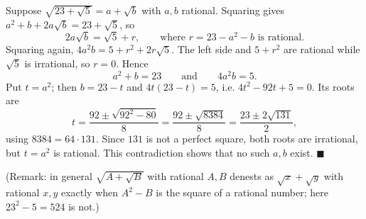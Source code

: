 Suppose $\sqrt{23+\sqrt5}=a+\sqrt b$ with $a,b$ rational. Squaring gives $a^2+b+2a\sqrt b=23+\sqrt5$, so
\[2a\sqrt b=\sqrt5+r,\qquad\text{where }r=23-a^2-b\text{ is rational}.\]
Squaring again, $4a^2b=5+r^2+2r\sqrt5$. The left side and $5+r^2$ are rational while $\sqrt5$ is irrational, so $r=0$. Hence
\[a^2+b=23\qquad\text{and}\qquad4a^2b=5.\]
Put $t=a^2$; then $b=23-t$ and $4t(23-t)=5$, i.e. $4t^2-92t+5=0$. Its roots are
\[t=\dfrac{92\pm\sqrt{92^2-80}}{8}=\dfrac{92\pm\sqrt{8384}}{8}=\dfrac{23\pm2\sqrt{131}}{2},\]
using $8384=64\cdot131$. Since $131$ is not a perfect square, both roots are irrational, but $t=a^2$ is rational. This contradiction shows that no such $a,b$ exist. $\blacksquare$

(Remark: in general $\sqrt{A+\sqrt B}$ with rational $A,B$ denests as $\sqrt x+\sqrt y$ with rational $x,y$ exactly when $A^2-B$ is the square of a rational number; here $23^2-5=524$ is not.)
